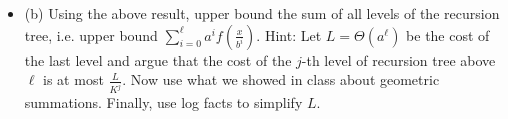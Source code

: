 \documentclass{article}
\begin{document}
\begin{enumerate}
\newpage
\begin{itemize}
    \item (b) Using the above result, upper bound the sum of all levels of the recursion tree, i.e. upper bound $\sum_{i=0}^{\ell}a^{i}f(\frac{x}{b^{i}})$. Hint: Let $L = \Theta(a^{\ell})$ be the cost of the last level and argue that the cost of the $j$-th level of recursion tree above $\ell$ is at most $\frac{L}{K^{j}}$. Now use what we showed in class about geometric summations. Finally, use log facts to simplify $L$.
\end{itemize}












\end{enumerate}
\end{document}
